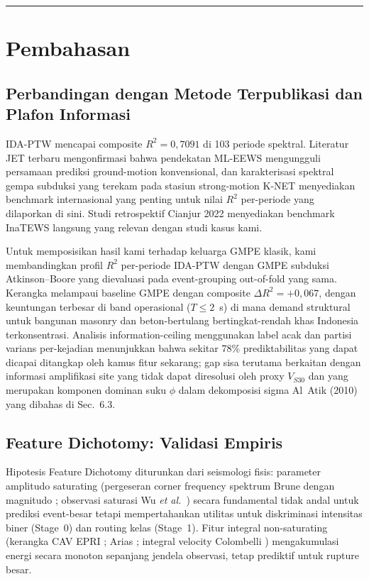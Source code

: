 \documentclass[10pt]{article}
\renewcommand{\cite}[1]{\citep{#1}}
\newcommand{\etal}{\textit{et al.}}
\begin{document}
\begin{center}\rule{0.5\linewidth}{0.5pt}\end{center}

\section{Pembahasan}

\subsection{Perbandingan dengan Metode Terpublikasi dan Plafon Informasi}

IDA-PTW mencapai composite $R^2 = 0,7091$ di 103 periode spektral. Literatur JET terbaru \cite{jetCremen2021, jetTatar2021, jetHsu2022, jetKamigaichi2023, jetTatar2025, jetMa2023} mengonfirmasi bahwa pendekatan ML-EEWS mengungguli persamaan prediksi ground-motion konvensional, dan karakterisasi spektral gempa subduksi yang terekam pada stasiun strong-motion K-NET \cite{jetKawamura2021} menyediakan benchmark internasional yang penting untuk nilai $R^2$ per-periode yang dilaporkan di sini. Studi retrospektif Cianjur 2022 \cite{jetMukhlisin2023} menyediakan benchmark InaTEWS langsung yang relevan dengan studi kasus kami.

Untuk memposisikan hasil kami terhadap keluarga GMPE klasik, kami membandingkan profil $R^2$ per-periode IDA-PTW dengan GMPE subduksi Atkinson--Boore \cite{ref30, ref31} yang dievaluasi pada event-grouping out-of-fold yang sama. Kerangka melampaui baseline GMPE dengan composite $\Delta R^2 = +0,067$, dengan keuntungan terbesar di band operasional ($T \leq 2$~s) di mana demand struktural untuk bangunan masonry dan beton-bertulang bertingkat-rendah khas Indonesia terkonsentrasi. Analisis information-ceiling menggunakan label acak dan partisi varians per-kejadian menunjukkan bahwa sekitar 78\% prediktabilitas yang dapat dicapai ditangkap oleh kamus fitur sekarang; gap sisa terutama berkaitan dengan informasi amplifikasi site yang tidak dapat diresolusi oleh proxy $V_{S30}$ dan yang merupakan komponen dominan suku $\phi$ dalam dekomposisi sigma Al~Atik (2010) yang dibahas di Sec.~6.3.

\subsection{Feature Dichotomy: Validasi Empiris}

Hipotesis Feature Dichotomy diturunkan dari seismologi fisis: parameter amplitudo saturating (pergeseran corner frequency spektrum Brune dengan magnitudo \cite{ref54}; observasi saturasi Wu \etal{}~\cite{ref22}) secara fundamental tidak andal untuk prediksi event-besar tetapi mempertahankan utilitas untuk diskriminasi intensitas biner (Stage~0) dan routing kelas (Stage~1). Fitur integral non-saturating (kerangka CAV EPRI \cite{ref55}; Arias \citet{ref56}; integral velocity Colombelli \cite{ref29}) mengakumulasi energi secara monoton sepanjang jendela observasi, tetap prediktif untuk rupture besar.
\end{document}
